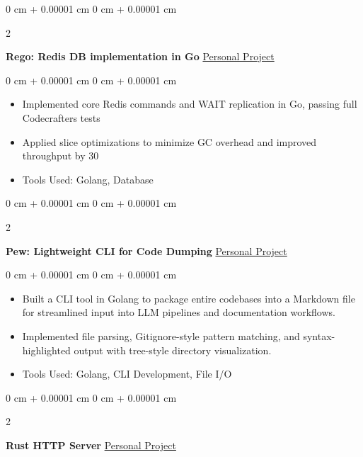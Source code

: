 \documentclass[10pt, letterpaper]{article}
\newenvironment{highlights}{
    \begin{itemize}[
        topsep=0.10 cm,
        parsep=0.10 cm,
        partopsep=0pt,
        itemsep=0pt,
        leftmargin=0 cm + 10pt
    ]
}{
    \end{itemize}
} %
\newenvironment{onecolentry}{
    \begin{adjustwidth}{
        0 cm + 0.00001 cm
    }{
        0 cm + 0.00001 cm
    }
}{
    \end{adjustwidth}
} %
\newenvironment{twocolentry}[2][]{
    \onecolentry
    \def\secondColumn{#2}
    \setcolumnwidth{\fill, 4.5 cm}
    \begin{paracol}{2}
}{
    \switchcolumn \raggedleft \secondColumn
    \end{paracol}
    \endonecolentry
} %
\begin{document}
        \vspace{0.2 cm} 

        \begin{twocolentry}{
            \href{https://github.com/yuann3/Pew/}{Personal Project}
        }
            \textbf{Rego: Redis DB implementation in Go}\end{twocolentry}

        \vspace{0.10 cm}
        \begin{onecolentry}
            \begin{highlights}
                \item Implemented core Redis commands and WAIT replication in Go, passing full Codecrafters tests
                \item Applied slice optimizations to minimize GC overhead and improved throughput by 30%
                \item Tools Used: Golang, Database
            \end{highlights}
        \end{onecolentry}

        \vspace{0.2 cm} 

        \begin{twocolentry}{
            \href{https://github.com/yuann3/Pew/}{Personal Project}
        }
            \textbf{Pew: Lightweight CLI for Code Dumping}\end{twocolentry}

        \vspace{0.10 cm}
        \begin{onecolentry}
            \begin{highlights}
                \item Built a CLI tool in Golang to package entire codebases into a Markdown file for streamlined input into LLM pipelines and documentation workflows.
                \item Implemented file parsing, Gitignore-style pattern matching, and syntax-highlighted output with tree-style directory visualization.
                \item Tools Used: Golang, CLI Development, File I/O
            \end{highlights}
        \end{onecolentry}


        \vspace{0.2 cm}

        \begin{twocolentry}{
            \href{https://github.com/yuann3/http-rust/}{Personal Project}
        }
            \textbf{Rust HTTP Server}\end{twocolentry}
\end{document}
